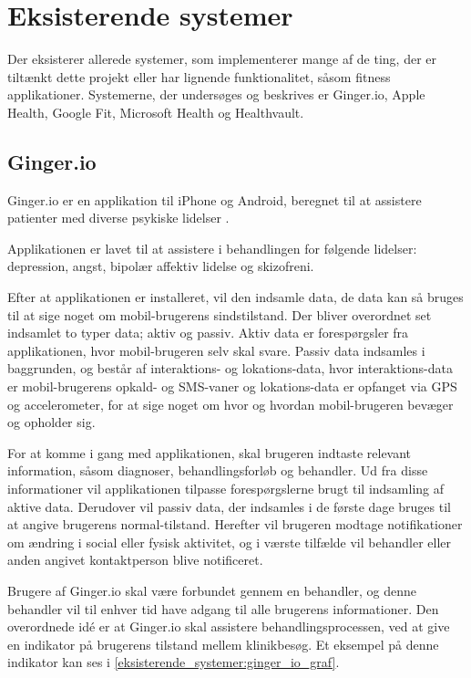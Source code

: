 \section{Eksisterende systemer}
Der eksisterer allerede systemer, som implementerer mange af de ting, der er tiltænkt dette projekt eller har lignende funktionalitet, såsom fitness applikationer. 
Systemerne, der undersøges og beskrives er Ginger.io, Apple Health, Google Fit, Microsoft Health og Healthvault.

\subsection{Ginger.io}
Ginger.io er en applikation til iPhone og Android, beregnet til at assistere patienter med diverse psykiske lidelser \citep{ginger_dot_io,gingerio_mit,gingerio_dailymail}.

Applikationen er lavet til at assistere i behandlingen for følgende lidelser: depression, angst, bipolær affektiv lidelse og skizofreni.

Efter at applikationen er installeret, vil den indsamle data, de data kan så bruges til at sige noget om mobil-brugerens sindstilstand.
Der bliver overordnet set indsamlet to typer data; aktiv og passiv.
Aktiv data er forespørgsler fra applikationen, hvor mobil-brugeren selv skal svare.
Passiv data indsamles i baggrunden, og består af interaktions- og lokations-data, hvor interaktions-data er mobil-brugerens opkald- og SMS-vaner og lokations-data er opfanget via GPS og accelerometer, for at sige noget om hvor og hvordan mobil-brugeren bevæger og opholder sig.

For at komme i gang med applikationen, skal brugeren indtaste relevant information, såsom diagnoser, behandlingsforløb og behandler.
Ud fra disse informationer vil applikationen tilpasse forespørgslerne brugt til indsamling af aktive data.
Derudover vil passiv data, der indsamles i de første dage bruges til at angive brugerens normal-tilstand.
Herefter vil brugeren modtage notifikationer om ændring i social eller fysisk aktivitet, og i værste tilfælde vil behandler eller anden angivet kontaktperson blive notificeret.

Brugere af Ginger.io skal være forbundet gennem en behandler, og denne behandler vil til enhver tid have adgang til alle brugerens informationer.
Den overordnede idé er at Ginger.io skal assistere behandlingsprocessen, ved at give en indikator på brugerens tilstand mellem klinikbesøg. 
Et eksempel på denne indikator kan ses i \cref{eksisterende_systemer:ginger_io_graf}.

